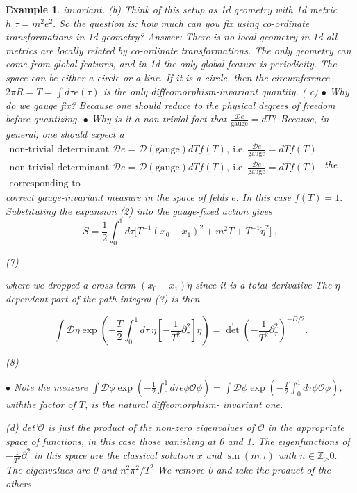 \documentclass[10pt,
 article,
 amsmath,amssymb
]{revtex4-2}
\newtheorem{example}[theorem]{Example}
\begin{document}
\begin{example}
invariant. 
(b) Think of this setup as 1d geometry with 1d metric $h_\tau\tau=m^2e^2.$ So the question is: how
much can you fix using co-ordinate transformations in 1d geometry?
Answer: There is no local geometry in 1d-all metrics are locally related by co-ordinate transformations. The only geometry can come from global features, and in 1d the only global feature is periodicity. The space can be either a circle or a line. If it is a circle, then the circumference $2\pi R=T=\int d\tau e(\tau)$ is the only diffeomorphism-invariant quantity.
( c) $\bullet$ Why do we gauge fix? Because one should reduce to the physical degrees of freedom
before quantizing.
$\bullet$ Why is it a non-trivial fact that $\frac{\mathcal{D}e}{\mathrm{gauge}}=dT?$ Because, in general, one should expect a $\begin{aligned}\text{non-trivial determinant }\mathcal{D}e=\mathcal{D}(\mathrm{gauge})dT\left.f(T),\mathrm{~i.e.~}\frac{\mathcal{D}e}{\mathrm{gauge}}\right.=dTf(T)\\\text{non-trivial determinant }\mathcal{D}e=\mathcal{D}(\mathrm{gauge})dT\left.f(T),\mathrm{~i.e.~}\frac{\mathcal{D}e}{\mathrm{gauge}}\right.=dTf(T)\\\text{corresponding to}\end{aligned}$ the correct gauge-invariant measure in the space of felds $e.$ In this case $f(T)=1.$
Substituting the expansion (2) into the gauge-fixed action gives
$$S=\frac12\int_0^1d\tau\big[T^{-1}(x_0-x_1)^2+m^2T+T^{-1}\dot{\eta}^2\big]\:,$$

(7)

where we dropped a cross-term $(x_0-x_1)\dot{\eta}$ since it is a total derivative
The $\eta$-dependent part of the path-integral (3) is then

$$\int\mathcal{D}\eta\exp\left(-\frac T2\int_0^1d\tau\:\eta[-\frac1{T^2}\partial_\tau^2]\eta\right)=\det^{\prime}\left(-\frac1{T^2}\partial_\tau^2\right)^{-D/2}.$$

(8)

$\bullet$ Note the measure $\int\mathcal{D}\phi\exp\left(-\frac12\int_0^1d\tau e\phi\mathcal{O}\phi\right)=\int\mathcal{D}\phi\exp\left(-\frac T2\int_0^1d\tau\phi\mathcal{O}\phi\right)$, withthe factor of $T$, is the natural diffeomorphism- invariant one. 

(d) det'$\mathcal{O}$ is just the product of the non-zero eigenvalues of $\mathcal{O}$ in the appropriate space of
functions, in this case those vanishing at 0 and 1. The eigenfunctions of $-\frac1{T^2}\partial_\tau^2$ in this space are the classical solution $\bar{x}$ and $\sin(n\pi\tau)$ with $n\in\mathbb{Z}_>0.$ The eigenvalues are 0 and $n^2\pi^2/T^2$ We remove 0 and take the product of the others.


\end{example}
\end{document}
